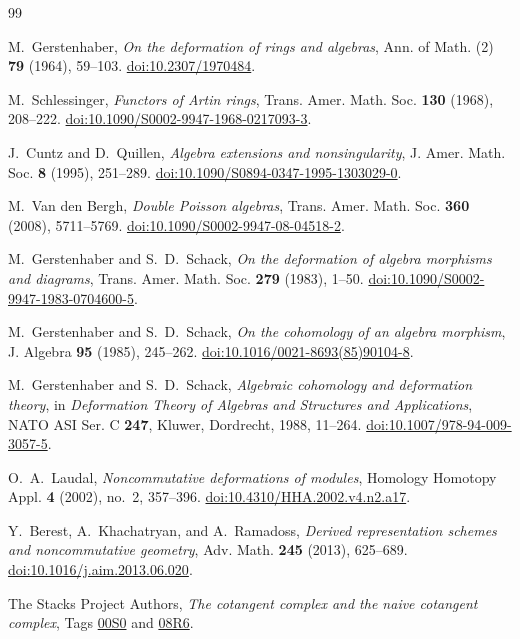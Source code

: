 \documentclass[11pt]{amsart}
\begin{document}
\begin{thebibliography}{99}

M.~Gerstenhaber,
\emph{On the deformation of rings and algebras},
Ann. of Math. (2) \textbf{79} (1964), 59--103.
\href{https://doi.org/10.2307/1970484}{doi:10.2307/1970484}.

M.~Schlessinger,
\emph{Functors of Artin rings},
Trans. Amer. Math. Soc. \textbf{130} (1968), 208--222.
\href{https://doi.org/10.1090/S0002-9947-1968-0217093-3}{doi:10.1090/S0002-9947-1968-0217093-3}.

J.~Cuntz and D.~Quillen,
\emph{Algebra extensions and nonsingularity},
J. Amer. Math. Soc. \textbf{8} (1995), 251--289.
\href{https://doi.org/10.1090/S0894-0347-1995-1303029-0}{doi:10.1090/S0894-0347-1995-1303029-0}.

M.~Van den Bergh,
\emph{Double Poisson algebras},
Trans. Amer. Math. Soc. \textbf{360} (2008), 5711--5769.
\href{https://doi.org/10.1090/S0002-9947-08-04518-2}{doi:10.1090/S0002-9947-08-04518-2}.

M.~Gerstenhaber and S.~D.~Schack,
\emph{On the deformation of algebra morphisms and diagrams},
Trans. Amer. Math. Soc. \textbf{279} (1983), 1--50.
\href{https://doi.org/10.1090/S0002-9947-1983-0704600-5}{doi:10.1090/S0002-9947-1983-0704600-5}.

M.~Gerstenhaber and S.~D.~Schack,
\emph{On the cohomology of an algebra morphism},
J. Algebra \textbf{95} (1985), 245--262.
\href{https://doi.org/10.1016/0021-8693(85)90104-8}{doi:10.1016/0021-8693(85)90104-8}.

M.~Gerstenhaber and S.~D.~Schack,
\emph{Algebraic cohomology and deformation theory},
in \emph{Deformation Theory of Algebras and Structures and Applications},
NATO ASI Ser. C \textbf{247}, Kluwer, Dordrecht, 1988, 11--264.
\href{https://doi.org/10.1007/978-94-009-3057-5}{doi:10.1007/978-94-009-3057-5}.

O.~A.~Laudal,
\emph{Noncommutative deformations of modules},
Homology Homotopy Appl. \textbf{4} (2002), no.~2, 357--396.
\href{https://doi.org/10.4310/HHA.2002.v4.n2.a17}{doi:10.4310/HHA.2002.v4.n2.a17}.

Y.~Berest, A.~Khachatryan, and A.~Ramadoss,
\emph{Derived representation schemes and noncommutative geometry},
Adv. Math. \textbf{245} (2013), 625--689.
\href{https://doi.org/10.1016/j.aim.2013.06.020}{doi:10.1016/j.aim.2013.06.020}.


The Stacks Project Authors,
\emph{The cotangent complex and the naive cotangent complex},
Tags \href{https://stacks.math.columbia.edu/tag/00S0}{00S0} and
\href{https://stacks.math.columbia.edu/tag/08R6}{08R6}.

\end{thebibliography}
\end{document}
